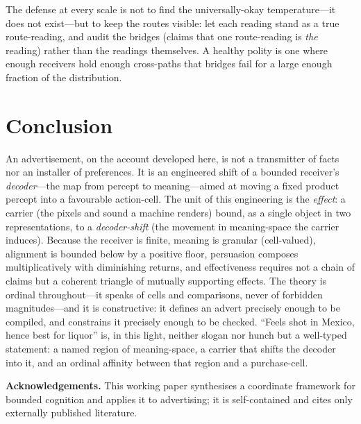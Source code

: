 \documentclass[twocolumn,11pt,a4paper]{article}
\theoremstyle{adv}
\theoremstyle{definition}
\theoremstyle{remark}
\begin{document}
The defense at every scale is not to find the universally-okay
temperature---it does not exist---but to keep the routes visible: let each
reading stand as a true route-reading, and audit the bridges (claims that
one route-reading is \emph{the} reading) rather than the readings
themselves. A healthy polity is one where enough receivers hold enough
cross-paths that bridges fail for a large enough fraction of the distribution.

\section{Conclusion}
\label{sec:conclusion}

An advertisement, on the account developed here, is not a transmitter of
facts nor an installer of preferences. It is an engineered shift of a
bounded receiver's \emph{decoder}---the map from percept to meaning---aimed
at moving a fixed product percept into a favourable action-cell. The unit
of this engineering is the \emph{effect}: a carrier (the pixels and sound a
machine renders) bound, as a single object in two representations, to a
\emph{decoder-shift} (the movement in meaning-space the carrier induces).
Because the receiver is finite, meaning is granular (cell-valued),
alignment is bounded below by a positive floor, persuasion composes
multiplicatively with diminishing returns, and effectiveness requires not a
chain of claims but a coherent triangle of mutually supporting effects. The
theory is ordinal throughout---it speaks of cells and comparisons, never of
forbidden magnitudes---and it is constructive: it defines an advert
precisely enough to be compiled, and constrains it precisely enough to be
checked. ``Feels shot in Mexico, hence best for liquor'' is, in this light,
neither slogan nor hunch but a well-typed statement: a named region of
meaning-space, a carrier that shifts the decoder into it, and an ordinal
affinity between that region and a purchase-cell.

\bigskip
\noindent\textbf{Acknowledgements.} This working paper synthesises a
coordinate framework for bounded cognition and applies it to advertising;
it is self-contained and cites only externally published literature.



\end{document}
